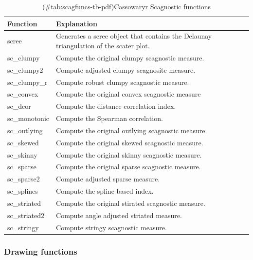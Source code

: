 \begin{Schunk}
\begin{table}

\caption{(\#tab:scagfuncs-tb-pdf)Cassowaryr Scagnostic functions}
\centering
\begin{tabular}[t]{>{\raggedright\arraybackslash}p{3cm}l}
\toprule
Function & Explanation\\
\midrule
scree & Generates a scree object that contains the Delaunay triangulation of the scater plot.\\
sc\_clumpy & Compute the original clumpy scagnostic measure.\\
sc\_clumpy2 & Compute adjusted clumpy scagnositc measure.\\
sc\_clumpy\_r & Compute robust clumpy scagnostic measure.\\
sc\_convex & Compute the original convex scagnostic measure\\
\addlinespace
sc\_dcor & Compute the distance correlation index.\\
sc\_monotonic & Compute the Spearman correlation.\\
sc\_outlying & Compute the original outlying scagnostic measure.\\
sc\_skewed & Compute the original skewed scagnostic measure.\\
sc\_skinny & Compute the original skinny scagnostic measure.\\
\addlinespace
sc\_sparse & Compute the original sparse scagnostic measure.\\
sc\_sparse2 & Compute adjusted sparse measure.\\
sc\_splines & Compute the spline based index.\\
sc\_striated & Compute the original stirated scagnostic measure.\\
sc\_striated2 & Compute angle adjusted striated measure.\\
\addlinespace
sc\_stringy & Compute stringy scagnostic measure.\\
\bottomrule
\end{tabular}
\end{table}

\end{Schunk}

\hypertarget{drawing-functions}{%
\subsubsection{Drawing functions}\label{drawing-functions}}

